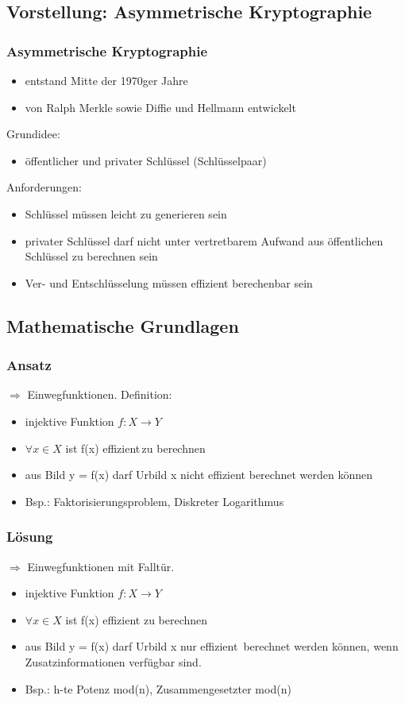 \documentclass{beamer}
\begin{document}
\subsection*{Vorstellung: Asymmetrische Kryptographie}
\begin{frame}
\frametitle{Asymmetrische Kryptographie}
\begin{itemize}
\item entstand Mitte der 1970ger Jahre\\
\item von Ralph Merkle sowie Diffie und Hellmann entwickelt\\
\end{itemize}
Grundidee:
\begin{itemize}
\item öffentlicher und privater Schlüssel (Schlüsselpaar)
\end{itemize}
Anforderungen:
\begin{itemize}
\item Schlüssel müssen leicht zu generieren sein
\item privater Schlüssel darf nicht unter vertretbarem Aufwand aus öffentlichen Schlüssel zu berechnen sein
\item Ver- und Entschlüsselung müssen effizient berechenbar sein
\end{itemize}
\end{frame}

\subsection*{Mathematische Grundlagen}
\begin{frame}
\frametitle{Ansatz}
\hspace{12mm}$\Rightarrow$ Einwegfunktionen.
Definition:
\begin{itemize}
\item injektive Funktion $f:X \rightarrow Y$
\item $\forall x \in X$ ist f(x) \glqq effizient\grqq \,zu berechnen
\item aus Bild y = f(x) darf Urbild x nicht effizient berechnet werden können
\item Bsp.: Faktorisierungsproblem, Diskreter Logarithmus
\end{itemize}
\end{frame}
\begin{frame}
\frametitle{Lösung}
\hspace{12mm}$\Rightarrow$ Einwegfunktionen mit Falltür.
\begin{itemize}
\item injektive Funktion $f:X \rightarrow Y$
\item $\forall x \in X$ ist f(x) effizient zu berechnen
\item aus Bild y = f(x) darf Urbild x nur \glqq effizient\grqq ~berechnet werden können, wenn Zusatzinformationen verfügbar sind.
\item Bsp.: h-te Potenz mod(n), Zusammengesetzter mod(n)
\end{itemize}
\end{frame}
\end{document}
